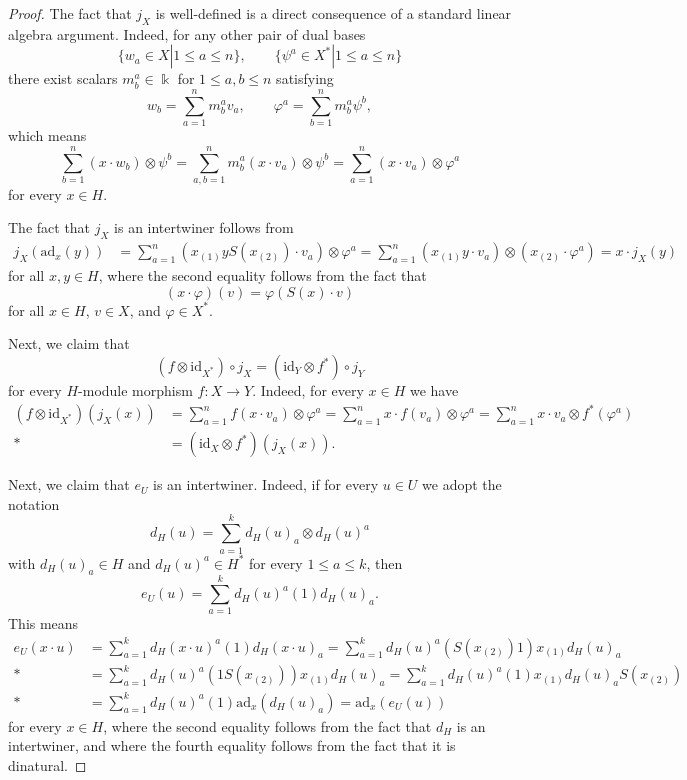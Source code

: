 \documentclass[a4paper,reqno]{amsart}
\theoremstyle{definition}
\theoremstyle{remark}
\renewcommand{\phi}{\varphi}
\newcommand{\ad}{\mathrm{ad}}
\newcommand{\id}{\mathrm{id}}
\newcommand{\leqs}{\leqslant}
\begin{document}
\begin{proof}
 The fact that $j_X$ is well-defined is a direct consequence of a standard linear algebra argument. Indeed, for any other pair of dual bases
 \[
  \{ w_a \in X | 1 \leqs a \leqs n \}, \qquad 
  \{ \psi^a \in X^* | 1 \leqs a \leqs n \}
 \]
 there exist scalars $m^a_b \in \Bbbk$ for $1 \leqs a,b \leqs n$ satisfying
 \[
  w_b = \sum_{a=1}^n m^a_b v_a, \qquad
  \phi^a = \sum_{b=1}^n m^a_b \psi^b,
 \]
 which means
 \[
  \sum_{b=1}^n (x \cdot w_b) \otimes \psi^b = \sum_{a,b=1}^n m^a_b (x \cdot v_a) \otimes \psi^b = \sum_{a=1}^n (x \cdot v_a) \otimes \phi^a
 \]
 for every $x \in H$. 
 
 The fact that $j_X$ is an intertwiner follows from
 \begin{align*}
  j_X(\ad_x(y)) &= \sum_{a=1}^n (x_{(1)}yS(x_{(2)}) \cdot v_a) \otimes \phi^a 
  = \sum_{a=1}^n (x_{(1)}y \cdot v_a) \otimes (x_{(2)} \cdot \phi^a) 
  = x \cdot j_X(y)
 \end{align*}
 for all $x,y \in H$, where the second equality follows from the fact that
 \[
  (x \cdot \phi)(v) = \phi(S(x) \cdot v)
 \]
 for all $x \in H$, $v \in X$, and $\phi \in X^*$.
  
 Next, we claim that 
 \[
  (f \otimes \id_{X^*}) \circ j_X  = (\id_Y \otimes f^*) \circ j_Y
 \]
 for every $H$-module morphism $f : X \to Y$. Indeed, for every $x \in H$ we have
 \begin{align*}
  (f \otimes \id_{X^*})(j_X(x)) &= \sum_{a=1}^n f(x \cdot v_a) \otimes \phi^a 
  = \sum_{a=1}^n x \cdot f(v_a) \otimes \phi^a 
  = \sum_{a=1}^n x \cdot v_a \otimes f^*(\phi^a) \\*
  &= (\id_X \otimes f^*)(j_X(x)).
 \end{align*}

 Next, we claim that $e_U$ is an intertwiner. Indeed, if for every $u \in U$ we adopt the notation
 \[
  d_H(u) = \sum_{a=1}^k d_H(u)_a \otimes d_H(u)^a
 \]
 with $d_H(u)_a \in H$ and $d_H(u)^a \in H^*$ for every $1 \leqs a \leqs k$, then
 \[
  e_U(u) = \sum_{a=1}^k d_H(u)^a(1) d_H(u)_a. 
 \]
 This means
 \begin{align*}
  e_U(x \cdot u) &= \sum_{a=1}^k d_H(x \cdot u)^a(1) d_H(x \cdot u)_a 
  = \sum_{a=1}^k d_H(u)^a(S(x_{(2)})1) x_{(1)}d_H(u)_a \\*
  &= \sum_{a=1}^k d_H(u)^a(1S(x_{(2)})) x_{(1)}d_H(u)_a 
  = \sum_{a=1}^k d_H(u)^a(1) x_{(1)}d_H(u)_aS(x_{(2)}) \\*
  &= \sum_{a=1}^k d_H(u)^a(1) \ad_x(d_H(u)_a) 
  = \ad_x(e_U(u))
 \end{align*}
 for every $x \in H$, where the second equality follows from the fact that $d_H$ is an intertwiner, and where the fourth equality follows from the fact that it is dinatural.
 

\end{proof}
\end{document}
